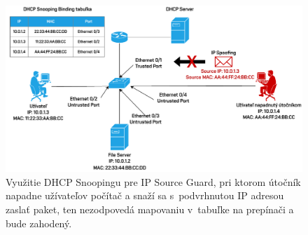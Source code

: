 \begin{figure}[H]
	\begin{center}
		\includegraphics[scale=0.75]{obrazky/dhcp-snoop.pdf}
	\end{center}
	\caption[DHCP Snooping a IP Source Guard]{Využitie DHCP Snoopingu pre IP Source Guard, pri ktorom útočník napadne užívateľov počítač a snaží sa s~podvrhnutou IP adresou zaslať paket, ten nezodpovedá mapovaniu v~tabuľke na prepínači a bude zahodený.}
	\label{fig:dhcpsnoop}
\end{figure}    


